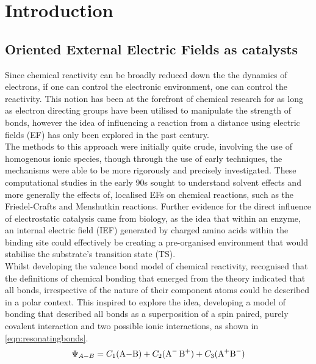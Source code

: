\vspace{-1.5cm}
\section{Introduction}
\subsection{Oriented External Electric Fields as catalysts}
Since chemical reactivity can be broadly reduced down the the dynamics of electrons, if one can control the electronic environment, one can control the reactivity. This notion has been at the forefront of chemical research for as long as electron directing groups have been utilised to manipulate the strength of bonds, however the idea of influencing a reaction from a distance using electric fields (EF) has only been explored in the past century.\\

The methods to this approach were initially quite crude, involving the use of homogenous ionic species\cite{Pocker1970}, though through the use of early \ai techniques, the mechanisms were able to be more rigorously and precisely investigated. These computational studies in the early 90s sought to understand solvent effects and more generally the effects of, localised EFs on chemical reactions, such as the Friedel-Crafts\cite{Carbonell1991} and Menshutkin\cite{Sola1991} reactions. Further evidence for the direct influence of electrostatic catalysis came from biology, as the idea that within an enzyme, an internal electric field (IEF) generated by charged amino acids within the binding site could effectively be creating a pre-organised environment that would stabilise the substrate's transition state (TS)\cite{Warshel2006}.\\

Whilst developing the valence bond model of chemical reactivity,  recognised that the definitions of chemical bonding that emerged from the theory indicated that all bonds, irrespective of the nature of their component atoms could be described in a polar context. This inspired  to explore the idea, developing a model of bonding that described all bonds as a superposition of a spin paired, purely covalent interaction and two possible ionic interactions, as shown in \ref{eqn:resonatingbonds}\cite{Shaik2020}.
\begin{gather}
\Psi_{A-B}=C_1(\ce{A-B})+C_2(\ce{A- B+})+C_3(\ce{A+B-})\label{eqn:resonatingbonds}
\end{gather}

